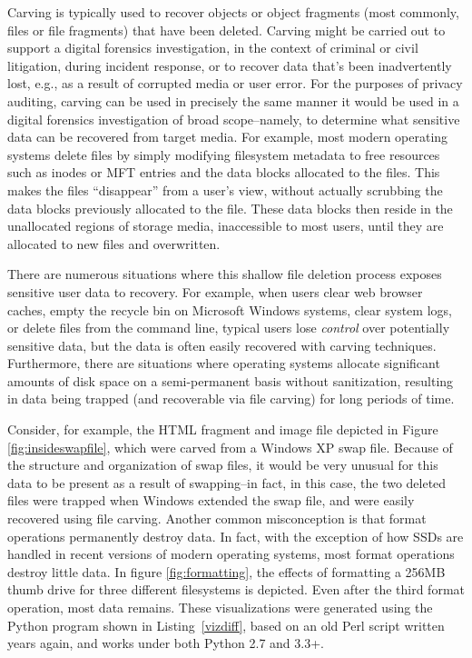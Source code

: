 Carving is typically used to recover objects or object fragments (most
commonly, files or file fragments) that have been deleted.  Carving
might be carried out to support a digital forensics investigation, in
the context of criminal or civil litigation, during incident response,
or to recover data that's been inadvertently lost, e.g., as a result
of corrupted media or user error.  For the purposes of privacy
auditing, carving can be used in precisely the same manner it would be
used in a digital forensics investigation of broad scope--namely, to
determine what sensitive data can be recovered from target media.  For
example, most modern operating systems delete files by simply
modifying filesystem metadata to free resources such as inodes or MFT
entries and the data blocks allocated to the files.  This makes the
files ``disappear'' from a user's view, without actually scrubbing the
data blocks previously allocated to the file.  These data blocks then
reside in the unallocated regions of storage media, inaccessible to
most users, until they are allocated to new files and overwritten.

There are numerous situations where this shallow file deletion process
exposes sensitive user data to recovery.  For example, when users
clear web browser caches, empty the recycle bin on Microsoft Windows
systems, clear system logs, or delete files from the command line,
typical users lose \emph{control} over potentially sensitive data, but
the data is often easily recovered with carving techniques.
Furthermore, there are situations where operating systems allocate
significant amounts of disk space on a semi-permanent basis without
sanitization, resulting in data being trapped (and recoverable via
file carving) for long periods of time.

Consider, for example, the HTML fragment and image file depicted in
Figure \ref{fig:insideswapfile}, which were carved from a Windows XP
swap file.  Because of the structure and organization of swap files,
it would be very unusual for this data to be present as a result of
swapping--in fact, in this case, the two deleted files were trapped
when Windows extended the swap file, and were easily recovered using
file carving.  Another common misconception is that format operations
permanently destroy data.  In fact, with the exception of how SSDs are
handled in recent versions of modern operating systems, most format
operations destroy little data.  In figure \ref{fig:formatting}, the
effects of formatting a 256MB thumb drive for three different
filesystems is depicted.  Even after the third format operation, most
data remains.  These visualizations were generated using the Python program
shown in Listing~\ref{vizdiff}, based on an old Perl script written years again, and works
under both Python 2.7 and 3.3+. 

